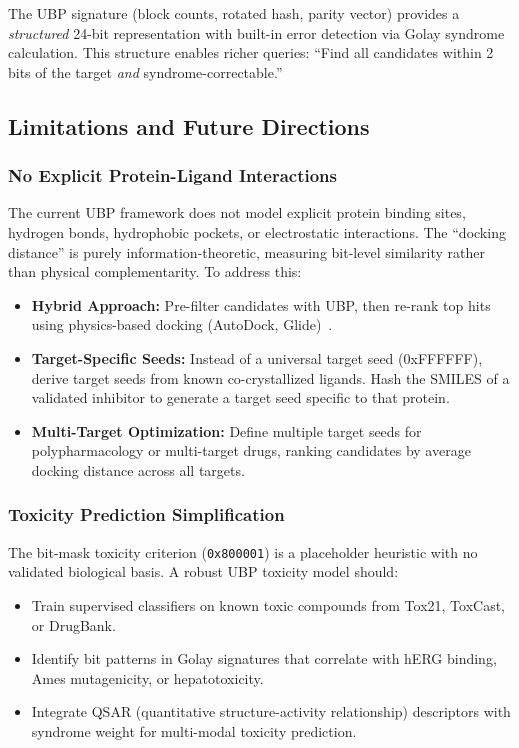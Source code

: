 \documentclass[12pt,a4paper]{article}
\begin{document}
The UBP signature (block counts, rotated hash, parity vector) provides a \textit{structured} 24-bit representation with built-in error detection via Golay syndrome calculation. This structure enables richer queries: ``Find all candidates within 2 bits of the target \textit{and} syndrome-correctable.''

\subsection{Limitations and Future Directions}

\subsubsection{No Explicit Protein-Ligand Interactions}

The current UBP framework does not model explicit protein binding sites, hydrogen bonds, hydrophobic pockets, or electrostatic interactions. The ``docking distance'' is purely information-theoretic, measuring bit-level similarity rather than physical complementarity. To address this:

\begin{itemize}
\item \textbf{Hybrid Approach:} Pre-filter candidates with UBP, then re-rank top hits using physics-based docking (AutoDock, Glide)~\cite{Leung2022Docking}.
\item \textbf{Target-Specific Seeds:} Instead of a universal target seed (0xFFFFFF), derive target seeds from known co-crystallized ligands. Hash the SMILES of a validated inhibitor to generate a target seed specific to that protein.
\item \textbf{Multi-Target Optimization:} Define multiple target seeds for polypharmacology or multi-target drugs, ranking candidates by average docking distance across all targets.
\end{itemize}

\subsubsection{Toxicity Prediction Simplification}

The bit-mask toxicity criterion (\texttt{0x800001}) is a placeholder heuristic with no validated biological basis. A robust UBP toxicity model should:

\begin{itemize}
\item Train supervised classifiers on known toxic compounds from Tox21, ToxCast, or DrugBank.
\item Identify bit patterns in Golay signatures that correlate with hERG binding, Ames mutagenicity, or hepatotoxicity.
\item Integrate QSAR (quantitative structure-activity relationship) descriptors with syndrome weight for multi-modal toxicity prediction.
\end{itemize}
\end{document}
